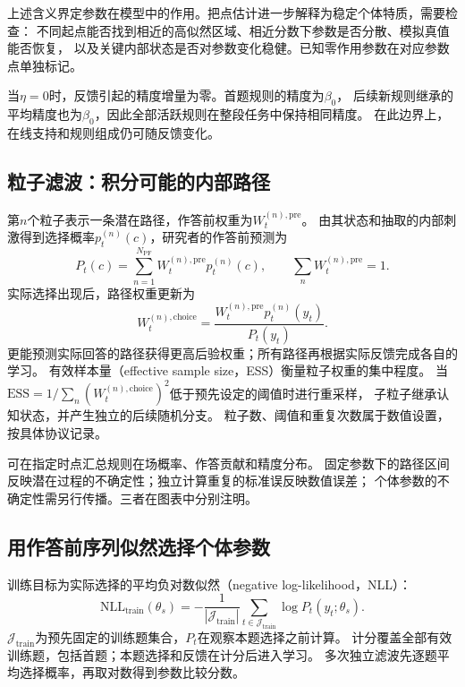 \documentclass[11pt,a4paper]{article}
\numberwithin{equation}{section}
\begin{document}
上述含义界定参数在模型中的作用。把点估计进一步解释为稳定个体特质，需要检查：
不同起点能否找到相近的高似然区域、相近分数下参数是否分散、模拟真值能否恢复，
以及关键内部状态是否对参数变化稳健。已知零作用参数在对应参数点单独标记。

当$\eta=0$时，反馈引起的精度增量为零。首题规则的精度为$\beta_0$，
后续新规则继承的平均精度也为$\beta_0$，因此全部活跃规则在整段任务中保持相同精度。
在此边界上，在线支持和规则组成仍可随反馈变化。

\subsection{粒子滤波：积分可能的内部路径}
第$n$个粒子表示一条潜在路径，作答前权重为$W_t^{(n),\mathrm{pre}}$。
由其状态和抽取的内部刺激得到选择概率$p_t^{(n)}(c)$，研究者的作答前预测为
\begin{equation}
P_t(c)=\sum_{n=1}^{N_{\mathrm{PF}}}W_t^{(n),\mathrm{pre}}p_t^{(n)}(c),\qquad
\sum_nW_t^{(n),\mathrm{pre}}=1.
\label{eq:pf-predict}
\end{equation}
实际选择出现后，路径权重更新为
\begin{equation}
W_t^{(n),\mathrm{choice}}=
\frac{W_t^{(n),\mathrm{pre}}p_t^{(n)}(y_t)}{P_t(y_t)}.
\label{eq:pf-update}
\end{equation}
更能预测实际回答的路径获得更高后验权重；所有路径再根据实际反馈完成各自的学习。
有效样本量（effective sample size，ESS）衡量粒子权重的集中程度。
当$\mathrm{ESS}=1/\sum_n(W_t^{(n),\mathrm{choice}})^2$低于预先设定的阈值时进行重采样，
子粒子继承认知状态，并产生独立的后续随机分支。
粒子数、阈值和重复次数属于数值设置，按具体协议记录。

可在指定时点汇总规则在场概率、作答贡献和精度分布。
固定参数下的路径区间反映潜在过程的不确定性；独立计算重复的标准误反映数值误差；
个体参数的不确定性需另行传播。三者在图表中分别注明。

\subsection{用作答前序列似然选择个体参数}
训练目标为实际选择的平均负对数似然（negative log-likelihood，NLL）：
\begin{equation}
\mathrm{NLL}_{\mathrm{train}}(\theta_s)=
-\frac1{|\mathcal J_{\mathrm{train}}|}\sum_{t\in\mathcal J_{\mathrm{train}}}
\log P_t(y_t;\theta_s).
\label{eq:objective}
\end{equation}
$\mathcal J_{\mathrm{train}}$为预先固定的训练题集合，$P_t$在观察本题选择之前计算。
计分覆盖全部有效训练题，包括首题；本题选择和反馈在计分后进入学习。
多次独立滤波先逐题平均选择概率，再取对数得到参数比较分数。
\end{document}
